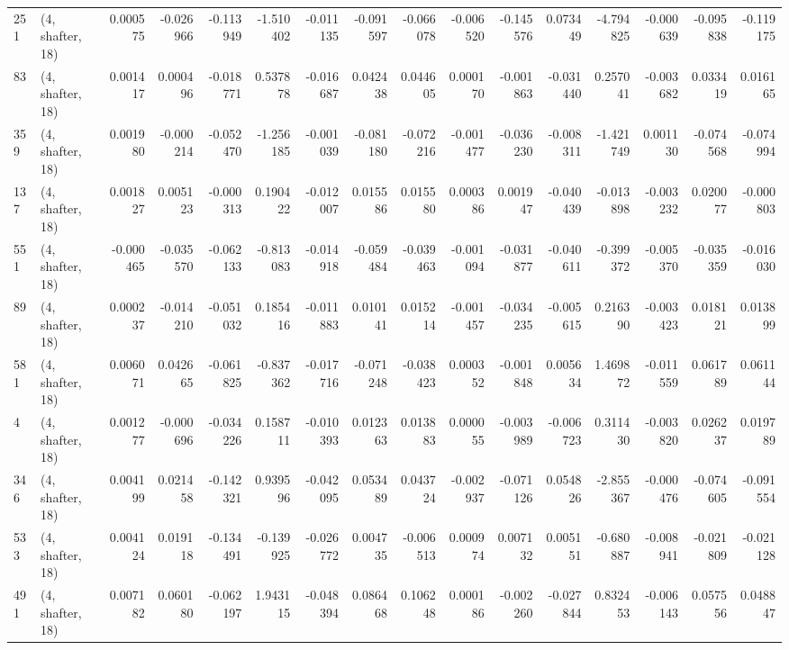 \begin{tabular}{llrrrrrrrrrrrrrr}
251 &  (4, shafter, 18) &   0.000575 & -0.026966 & -0.113949 &   -1.510402 & -0.011135 &  -0.091597 & -0.066078 & -0.006520 & -0.145576 &  0.073449 &   -4.794825 & -0.000639 & -0.095838 & -0.119175 \\
83  &  (4, shafter, 18) &   0.001417 &  0.000496 & -0.018771 &    0.537878 & -0.016687 &   0.042438 &  0.044605 &  0.000170 & -0.001863 & -0.031440 &    0.257041 & -0.003682 &  0.033419 &  0.016165 \\
359 &  (4, shafter, 18) &   0.001980 & -0.000214 & -0.052470 &   -1.256185 & -0.001039 &  -0.081180 & -0.072216 & -0.001477 & -0.036230 & -0.008311 &   -1.421749 &  0.001130 & -0.074568 & -0.074994 \\
137 &  (4, shafter, 18) &   0.001827 &  0.005123 & -0.000313 &    0.190422 & -0.012007 &   0.015586 &  0.015580 &  0.000386 &  0.001947 & -0.040439 &   -0.013898 & -0.003232 &  0.020077 & -0.000803 \\
551 &  (4, shafter, 18) &  -0.000465 & -0.035570 & -0.062133 &   -0.813083 & -0.014918 &  -0.059484 & -0.039463 & -0.001094 & -0.031877 & -0.040611 &   -0.399372 & -0.005370 & -0.035359 & -0.016030 \\
89  &  (4, shafter, 18) &   0.000237 & -0.014210 & -0.051032 &    0.185416 & -0.011883 &   0.010141 &  0.015214 & -0.001457 & -0.034235 & -0.005615 &    0.216390 & -0.003423 &  0.018121 &  0.013899 \\
581 &  (4, shafter, 18) &   0.006071 &  0.042665 & -0.061825 &   -0.837362 & -0.017716 &  -0.071248 & -0.038423 &  0.000352 & -0.001848 &  0.005634 &    1.469872 & -0.011559 &  0.061789 &  0.061144 \\
4   &  (4, shafter, 18) &   0.001277 & -0.000696 & -0.034226 &    0.158711 & -0.010393 &   0.012363 &  0.013883 &  0.000055 & -0.003989 & -0.006723 &    0.311430 & -0.003820 &  0.026237 &  0.019789 \\
346 &  (4, shafter, 18) &   0.004199 &  0.021458 & -0.142321 &    0.939596 & -0.042095 &   0.053489 &  0.043724 & -0.002937 & -0.071126 &  0.054826 &   -2.855367 & -0.000476 & -0.074605 & -0.091554 \\
533 &  (4, shafter, 18) &   0.004124 &  0.019118 & -0.134491 &   -0.139925 & -0.026772 &   0.004735 & -0.006513 &  0.000974 &  0.007132 &  0.005151 &   -0.680887 & -0.008941 & -0.021809 & -0.021128 \\
491 &  (4, shafter, 18) &   0.007182 &  0.060180 & -0.062197 &    1.943115 & -0.048394 &   0.086468 &  0.106248 &  0.000186 & -0.002260 & -0.027844 &    0.832453 & -0.006143 &  0.057556 &  0.048847 \\

\end{tabular}
